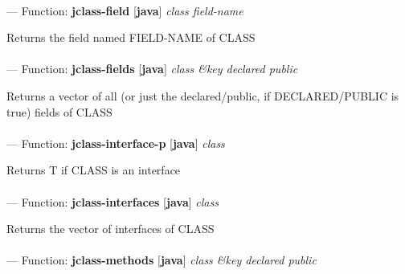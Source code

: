 \paragraph{}
\label{JAVA:JCLASS-FIELD}
--- Function: \textbf{jclass-field} [\textbf{java}] \textit{class field-name}

\begin{adjustwidth}{5em}{5em}
Returns the field named FIELD-NAME of CLASS
\end{adjustwidth}

\paragraph{}
\label{JAVA:JCLASS-FIELDS}
--- Function: \textbf{jclass-fields} [\textbf{java}] \textit{class \&key declared public}

\begin{adjustwidth}{5em}{5em}
Returns a vector of all (or just the declared/public, if DECLARED/PUBLIC is true) fields of CLASS
\end{adjustwidth}

\paragraph{}
\label{JAVA:JCLASS-INTERFACE-P}
--- Function: \textbf{jclass-interface-p} [\textbf{java}] \textit{class}

\begin{adjustwidth}{5em}{5em}
Returns T if CLASS is an interface
\end{adjustwidth}

\paragraph{}
\label{JAVA:JCLASS-INTERFACES}
--- Function: \textbf{jclass-interfaces} [\textbf{java}] \textit{class}

\begin{adjustwidth}{5em}{5em}
Returns the vector of interfaces of CLASS
\end{adjustwidth}

\paragraph{}
\label{JAVA:JCLASS-METHODS}
--- Function: \textbf{jclass-methods} [\textbf{java}] \textit{class \&key declared public}

